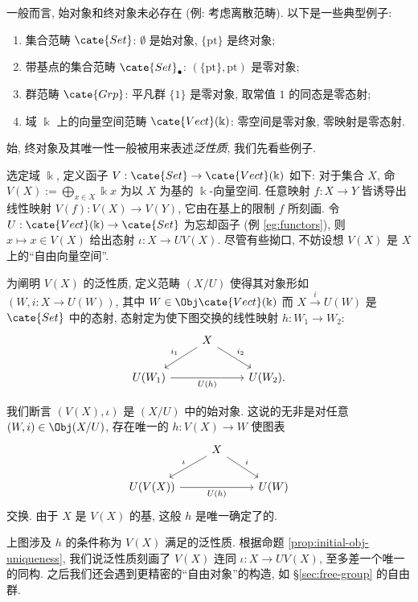 \begin{example}
	一般而言, 始对象和终对象未必存在 (例: 考虑离散范畴). 以下是一些典型例子:
	\begin{enumerate}
		\item 集合范畴 $\cate{Set}$: $\emptyset$ 是始对象, $\{\text{pt}\}$ 是终对象;
		\item 带基点的集合范畴 $\cate{Set}_\bullet$: $(\{\text{pt}\}, \text{pt})$ 是零对象;
		\item 群范畴 $\cate{Grp}$: 平凡群 $\{1\}$ 是零对象, 取常值 $1$ 的同态是零态射;
		\item 域 $\Bbbk$ 上的向量空间范畴 $\cate{Vect}(\Bbbk)$: 零空间是零对象, 零映射是零态射.
	\end{enumerate}
\end{example}

始, 终对象及其唯一性一般被用来表述\emph{泛性质}, 我们先看些例子.
\begin{example}\label{eg:free-vectorspace}
	选定域 $\Bbbk$, 定义函子 $V: \cate{Set} \to \cate{Vect}(\Bbbk)$ 如下: 对于集合 $X$, 命 $V(X) := \bigoplus_{x \in X} \Bbbk x$ 为以 $X$ 为基的 $\Bbbk$-向量空间. 任意映射 $f: X \to Y$ 皆诱导出线性映射 $V(f): V(X) \to V(Y)$, 它由在基上的限制 $f$ 所刻画. 令 $U: \cate{Vect}(\Bbbk) \to \cate{Set}$ 为忘却函子 (例 \ref{eg:functors}), 则 $x \mapsto x \in V(X)$ 给出态射 $\iota: X \to UV(X)$. 尽管有些拗口, 不妨设想 $V(X)$ 是 $X$ 上的``自由向量空间''.

	为阐明 $V(X)$ 的泛性质, 定义范畴 $(X / U)$ 使得其对象形如 $(W, i: X \to U(W))$, 其中 $W \in \Obj \cate{Vect}(\Bbbk)$ 而 $X \xrightarrow{i} U(W)$ 是 $\cate{Set}$ 中的态射, 态射定为使下图交换的线性映射 $h: W_1 \to W_2$:
	\[ \begin{tikzcd}
		{} & X \arrow[ld, "i_1"'] \arrow[rd, "i_2"] & \\
		U(W_1) \arrow[rr, "U(h)"'] & & U(W_2).
  \end{tikzcd} \]

	我们断言 $(V(X), \iota)$ 是 $(X / U)$ 中的始对象. 这说的无非是对任意 $(W, i) \in \Obj(X / U)$, 存在唯一的 $h: V(X) \to W$ 使图表
	\[\begin{tikzcd}
		{} & X \arrow[ld, "\iota"'] \arrow[rd, "i"] & \\
		U(V(X)) \arrow[rr, "U(h)"'] & & U(W)
	\end{tikzcd}\]
	交换. 由于 $X$ 是 $V(X)$ 的基, 这般 $h$ 是唯一确定了的.

	上图涉及 $h$ 的条件称为 $V(X)$ 满足的泛性质. 根据命题 \ref{prop:initial-obj-uniqueness}, 我们说泛性质刻画了 $V(X)$ 连同 $\iota: X \to UV(X)$, 至多差一个唯一的同构. 之后我们还会遇到更精密的``自由对象''的构造, 如 \S\ref{sec:free-group} 的自由群.
\end{example}

